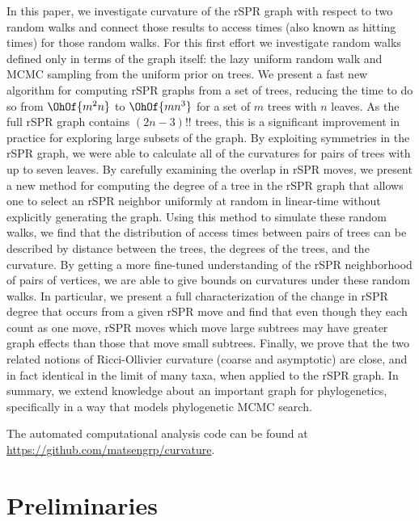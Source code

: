\documentclass[11pt,onecolumn,conference]{IEEEtran}
\begin{document}
In this paper, we investigate curvature of the rSPR graph with respect to two random walks and connect those results to access times (also known as hitting times) for those random walks.
For this first effort we investigate random walks defined only in terms of the graph itself: the lazy uniform random walk and MCMC sampling from the uniform prior on trees.
We present a fast new algorithm for computing rSPR graphs from a set of trees, reducing the time to do so from $\OhOf{m^2n}$ to $\OhOf{mn^3}$ for a set of $m$ trees with $n$ leaves.
As the full rSPR graph contains $(2n-3)!!$ trees, this is a significant improvement in practice for exploring large subsets of the graph.
By exploiting symmetries in the rSPR graph, we were able to calculate all of the curvatures for pairs of trees with up to seven leaves.
By carefully examining the overlap in rSPR moves, we present a new method for computing the degree of a tree in the rSPR graph that allows one to select an rSPR neighbor uniformly at random in linear-time without explicitly generating the graph.
Using this method to simulate these random walks, we find that the distribution of access times between pairs of trees can be described by distance between the trees, the degrees of the trees, and the curvature.
By getting a more fine-tuned understanding of the rSPR neighborhood of pairs of vertices, we are able to give bounds on curvatures under these random walks.
In particular, we present a full characterization of the change in rSPR degree that occurs from a given rSPR move and find that even though they each count as one move, rSPR moves which move large subtrees may have greater graph effects than those that move small subtrees.
Finally, we prove that the two related notions of Ricci-Ollivier curvature (coarse and asymptotic) are close, and in fact identical in the limit of many taxa, when applied to the rSPR graph.
In summary, we extend knowledge about an important graph for phylogenetics, specifically in a way that models phylogenetic MCMC search.

The automated computational analysis code can be found at \url{https://github.com/matsengrp/curvature}.


\section{Preliminaries}
\end{document}
